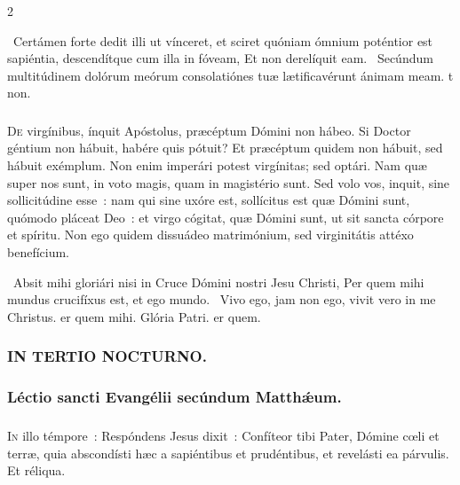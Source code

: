 \documentclass[9pt,twoside]{extarticle}
\begin{document}
\begin{multicols}{2}
\begin{tightlist}{}
\item {}~Certámen forte dedit illi ut vínceret, et sciret quóniam ómnium poténtior est sapiéntia, descendítque cum illa in fóveam, \textred{*} Et non derelíquit eam. ~Secúndum multitúdinem dolórum meórum consolatiónes tuæ lætificavérunt ánimam meam. t non.
\end{tightlist}

\subsubsection*{\center {}}
\lettrine{D}e virgínibus, ínquit Apóstolus, præcéptum Dómini non hábeo. Si Doctor géntium non hábuit, habére quis pótuit? Et præcéptum quidem non hábuit, sed hábuit exémplum. Non enim imperári potest virgínitas; sed optári. Nam quæ super nos sunt, in voto magis, quam in magistério sunt. Sed volo vos, inquit, sine sollicitúdine esse~: nam qui sine uxóre est, sollícitus est quæ Dómini sunt, quómodo pláceat Deo~: et virgo cógitat, quæ Dómini sunt, ut sit sancta córpore et spíritu. Non ego quidem dissuádeo matrimónium, sed virginitátis attéxo benefícium.

\begin{tightlist}{}
\item {}~Absit mihi gloriári nisi in Cruce Dómini nostri Jesu Christi, \textred{*} Per quem mihi mundus crucifíxus est, et ego mundo. ~Vivo ego, jam non ego, vivit vero in me Christus. er quem mihi. Glória Patri. er quem.
\end{tightlist}

\subsubsection*{\center \textsc{IN TERTIO NOCTURNO.}}
\subsubsection*{\center Léctio sancti Evangélii secúndum Matthǽum.}
\subsubsection*{\center {}}
\lettrine{I}n illo témpore~: Respóndens Jesus dixit~: Confíteor tibi Pater, Dómine cœli et terræ, quia abscondísti hæc a sapiéntibus et prudéntibus, et revelásti ea párvulis. Et réliqua.


\end{multicols}
\end{document}
